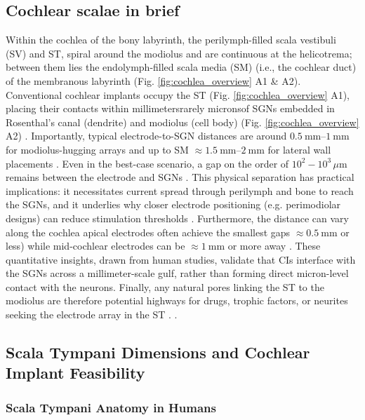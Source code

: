 \documentclass[referee,pdflatex, sn-vancouver-num]{sn-jnl}%
\theoremstyle{thmstyleone}%
\theoremstyle{thmstyletwo}%
\theoremstyle{thmstylethree}%
\newcommand{\um}{\ensuremath{\,\mu\mathrm{m}}}
\begin{document}
\subsection{Cochlear scalae in brief}  
Within the cochlea of the bony labyrinth, the perilymph-filled scala vestibuli (SV) and ST, spiral around the modiolus and are continuous at the helicotrema; between them lies the endolymph-filled scala media (SM) (i.e., the cochlear duct) of the membranous labyrinth (Fig. \ref{fig:cochlea_overview} A1 \& A2). Conventional cochlear implants occupy the ST (Fig. \ref{fig:cochlea_overview} A1), placing their contacts within millimeters\textemdash rarely microns\textemdash of SGNs embedded in Rosenthal's canal (dendrite) and modiolus (cell body) (Fig. \ref{fig:cochlea_overview} A2) \cite{Starovoyt2023_SciRep_CochlearMicrostructures,Micuda2024_Laryngoscope_SRPCI_ST}. Importantly, typical electrode-to-SGN distances are around $\SIrange{0.5}{1}{\mm}$ for modiolus-hugging arrays and up to SM $\approx \SIrange{1.5}{2}{\mm}$ for lateral wall placements \cite{Sharma2024_Laryngoscope_EMDApproach}. Even in the best-case scenario, a gap on the order of $10^{2}-10^{3}{\um}$ remains between the electrode and SGNs \cite{Sriperumbudur2024_SciRep_EfieldPorosity}. This physical separation has practical implications: it necessitates current spread through perilymph and bone to reach the SGNs, and it underlies why closer electrode positioning (e.g. perimodiolar designs) can reduce stimulation thresholds \cite{Kawano1998}. Furthermore, the distance can vary along the cochlea \textemdash apical electrodes often achieve the smallest gaps $\approx \SI{0.5}\mm$ or less) while mid-cochlear electrodes can be $\approx \SI{1}\mm$ or more away \cite{Long2014}. These quantitative insights, drawn from human studies, validate that CIs interface with the SGNs across a millimeter-scale gulf, rather than forming direct micron-level contact with the neurons. Finally, any natural pores linking the ST to the modiolus are therefore potential highways for drugs, trophic factors, or neurites seeking the electrode array in the ST \cite{Braga2023_JARO_OSLmicroCT,Starovoyt2023_SciRep_CochlearMicrostructures}.
.

\subsection{Scala Tympani Dimensions and Cochlear Implant Feasibility}
\subsubsection{Scala Tympani Anatomy in Humans}
\end{document}
